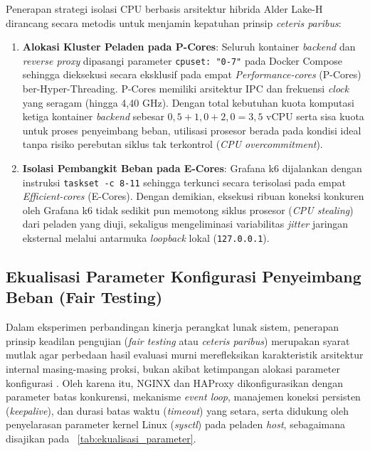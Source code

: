 Penerapan strategi isolasi CPU berbasis arsitektur hibrida Alder Lake-H dirancang secara metodis untuk menjamin kepatuhan prinsip \textit{ceteris paribus}:
\begin{enumerate}
    \item \textbf{Alokasi Kluster Peladen pada P-Cores}: Seluruh kontainer \textit{backend} dan \textit{reverse proxy} dipasangi parameter \texttt{cpuset: "0-7"} pada Docker Compose sehingga dieksekusi secara eksklusif pada empat \textit{Performance-cores} (P-Cores) ber-Hyper-Threading. P-Cores memiliki arsitektur IPC dan frekuensi \textit{clock} yang seragam (hingga 4{,}40 GHz). Dengan total kebutuhan kuota komputasi ketiga kontainer \textit{backend} sebesar $0{,}5 + 1{,}0 + 2{,}0 = 3{,}5$ vCPU serta sisa kuota untuk proses penyeimbang beban, utilisasi prosesor berada pada kondisi ideal tanpa risiko perebutan siklus tak terkontrol (\textit{CPU overcommitment}).
    \item \textbf{Isolasi Pembangkit Beban pada E-Cores}: Grafana k6 dijalankan dengan instruksi \texttt{taskset -c 8-11} sehingga terkunci secara terisolasi pada empat \textit{Efficient-cores} (E-Cores). Dengan demikian, eksekusi ribuan koneksi konkuren oleh Grafana k6 tidak sedikit pun memotong siklus prosesor (\textit{CPU stealing}) dari peladen yang diuji, sekaligus mengeliminasi variabilitas \textit{jitter} jaringan eksternal melalui antarmuka \textit{loopback} lokal (\texttt{127.0.0.1}).
\end{enumerate}

\subsection{Ekualisasi Parameter Konfigurasi Penyeimbang Beban (Fair Testing)}
Dalam eksperimen perbandingan kinerja perangkat lunak sistem, penerapan prinsip keadilan pengujian (\textit{fair testing} atau \textit{ceteris paribus}) merupakan syarat mutlak agar perbedaan hasil evaluasi murni merefleksikan karakteristik arsitektur internal masing-masing proksi, bukan akibat ketimpangan alokasi parameter konfigurasi \citep{rawls2022load}. Oleh karena itu, NGINX dan HAProxy dikonfigurasikan dengan parameter batas konkurensi, mekanisme \textit{event loop}, manajemen koneksi persisten (\textit{keepalive}), dan durasi batas waktu (\textit{timeout}) yang setara, serta didukung oleh penyelarasan parameter kernel Linux (\textit{sysctl}) pada peladen \textit{host}, sebagaimana disajikan pada \tablename\ \ref{tab:ekualisasi_parameter}.


